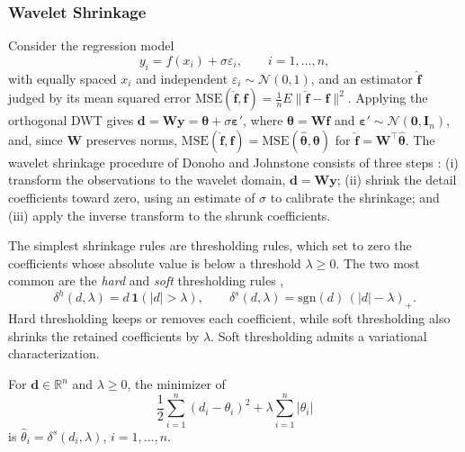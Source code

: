 \subsubsection{Wavelet Shrinkage}

Consider the regression model \cite[Sec.~6.1]{vidakovic1999}
\begin{equation}
y_i = f(x_i)+\sigma\varepsilon_i,\qquad i = 1,\dots,n,
\label{eq:wavelet_regression}
\end{equation}
with equally spaced $x_i$ and independent $\varepsilon_i\sim\mathcal{N}(0,1)$,
and an estimator $\hat{\mathbf{f}}$ judged by its mean squared error
$\mathrm{MSE}(\hat{\mathbf{f}},\mathbf{f}) =
\frac{1}{n}E\|\hat{\mathbf{f}}-\mathbf{f}\|^2$. Applying the orthogonal
DWT gives $\mathbf{d} = \mathbf{W}\mathbf{y} = \boldsymbol{\theta}+
\sigma\boldsymbol{\varepsilon}'$, where $\boldsymbol{\theta} =
\mathbf{W}\mathbf{f}$ and $\boldsymbol{\varepsilon}'\sim
\mathcal{N}(\mathbf{0},\mathbf{I}_n)$, and, since $\mathbf{W}$ preserves
norms, $\mathrm{MSE}(\hat{\mathbf{f}},\mathbf{f}) =
\mathrm{MSE}(\hat{\boldsymbol{\theta}},\boldsymbol{\theta})$ for
$\hat{\mathbf{f}} = \mathbf{W}^\top\hat{\boldsymbol{\theta}}$. The
wavelet shrinkage procedure of Donoho and Johnstone consists of three steps
\cite[Sec.~6.1]{vidakovic1999}: (i) transform the observations to the wavelet
domain, $\mathbf{d} = \mathbf{W}\mathbf{y}$; (ii) shrink the detail
coefficients toward zero, using an estimate of $\sigma$ to calibrate the
shrinkage; and (iii) apply the inverse transform to the shrunk coefficients.

The simplest shrinkage rules are thresholding rules, which set to zero the
coefficients whose absolute value is below a threshold $\lambda\geq 0$. The
two most common are the \emph{hard} and \emph{soft} thresholding rules
\cite[Sec.~6.3]{vidakovic1999},
\begin{equation}
\delta^h(d,\lambda) = d\,\mathbf{1}(|d|>\lambda),\qquad
\delta^s(d,\lambda) = \mathrm{sgn}(d)\,(|d|-\lambda)_+.
\label{eq:hard_soft}
\end{equation}
Hard thresholding keeps or removes each coefficient, while soft thresholding
also shrinks the retained coefficients by $\lambda$. Soft thresholding admits
a variational characterization.

\begin{proposition}
\label{prop:soft_lasso}
For $\mathbf{d}\in\mathbb{R}^n$ and $\lambda\geq 0$, the minimizer of
\begin{equation}
\frac{1}{2}\sum_{i=1}^n(d_i-\theta_i)^2+\lambda\sum_{i=1}^n|\theta_i|
\label{eq:l1_criterion}
\end{equation}
is $\hat{\theta}_i = \delta^s(d_i,\lambda)$, $i = 1,\dots,n$.
\end{proposition}

